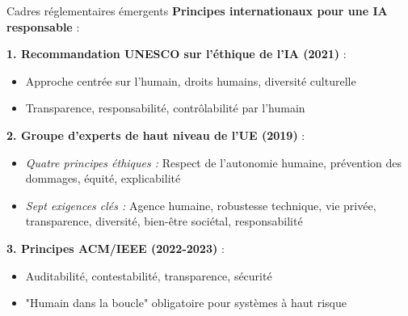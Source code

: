 \documentclass[9pt, aspectratio=169]{beamer}
\begin{document}
\begin{frame}{Cadres réglementaires émergents}
    \textbf{Principes internationaux pour une IA responsable} :
    
    \vspace{0.3cm}
    \textbf{1. Recommandation UNESCO sur l'éthique de l'IA (2021)} :
    \begin{itemize}
        \item Approche centrée sur l'humain, droits humains, diversité culturelle
        \item Transparence, responsabilité, contrôlabilité par l'humain
    \end{itemize}
    
    \textbf{2. Groupe d'experts de haut niveau de l'UE (2019)} :
    \begin{itemize}
        \item \textit{Quatre principes éthiques :} Respect de l'autonomie humaine, prévention des dommages, équité, explicabilité
        \item \textit{Sept exigences clés :} Agence humaine, robustesse technique, vie privée, transparence, diversité, bien-être sociétal, responsabilité
    \end{itemize}
    
    \textbf{3. Principes ACM/IEEE (2022-2023)} :
    \begin{itemize}
        \item Auditabilité, contestabilité, transparence, sécurité
        \item "Humain dans la boucle" obligatoire pour systèmes à haut risque
    \end{itemize}
\end{frame}
\end{document}
